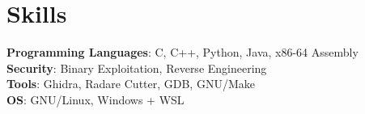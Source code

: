 \documentclass[letterpaper,11pt]{article}
\makeatletter
\newcommand{\resumeItem}[1]{
  \item{
    {#1 \vspace{-4pt}}
  }
}
\newcommand{\resumeSubheading}[4]{
  \vspace{-2pt}\item
    \begin{tabular*}{0.97\textwidth}[t]{l@{\extracolsep{\fill}}r}
      \textbf{#1} & #2 \\
      {\small #3} & {\small #4} \\
    \end{tabular*}\vspace{-10pt}
}
\newcommand{\resumeSubHeadingListEnd}{\end{itemize}}
\newcommand{\resumeItemListStart}{\begin{itemize}}
\newcommand{\resumeItemListEnd}{\end{itemize}\vspace{-2pt}}
\makeatother
\begin{document}



\section{Skills}
\begin{itemize}[leftmargin=0.15in, label={}]
    \normalsize{\item{
     \textbf{Programming Languages}{: C, C++, Python, Java, x86-64 Assembly} \\
     \textbf{Security}{: Binary Exploitation, Reverse Engineering}\\
     \textbf{Tools}{: Ghidra, Radare Cutter, GDB, GNU/Make} \\
     \textbf{OS}{: GNU/Linux, Windows + WSL} \\
    }}
 \end{itemize}

\end{document}

